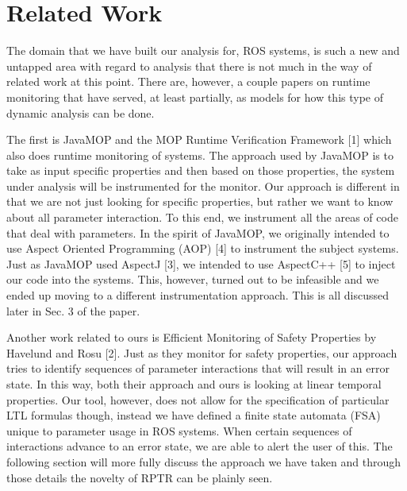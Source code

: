 \section{Related Work}

The domain that we have built our analysis for, ROS systems, is such a new and untapped area with regard to analysis that there is not much in the way of related work at this point. There are, however, a couple papers on runtime monitoring that have served, at least partially, as models for how this type of dynamic analysis can be done.

The first is JavaMOP and the MOP Runtime Verification Framework [1] which also does runtime monitoring of systems. The approach used by JavaMOP is to take as input specific properties and then based on those properties, the system under analysis will be instrumented for the monitor. Our approach is different in that we are not just looking for specific properties, but rather we want to know about all parameter interaction. To this end, we instrument all the areas of code that deal with parameters. In the spirit of JavaMOP, we originally intended to use Aspect Oriented Programming (AOP) [4] to instrument the subject systems. Just as JavaMOP used AspectJ [3], we intended to use AspectC++ [5] to inject our code into the systems. This, however, turned out to be infeasible and we ended up moving to a different instrumentation approach. This is all discussed later in Sec. 3 of the paper.

Another work related to ours is Efficient Monitoring of Safety Properties by Havelund and Rosu [2]. Just as they monitor for safety properties, our approach tries to identify sequences of parameter interactions that will result in an error state. In this way, both their approach and ours is looking at linear temporal properties. Our tool, however, does not allow for the specification of particular LTL formulas though, instead we have defined a finite state automata (FSA) unique to parameter usage in ROS systems. When certain sequences of interactions advance to an error state, we are able to alert the user of this. The following section will more fully discuss the approach we have taken and through those details the novelty of RPTR can be plainly seen.
